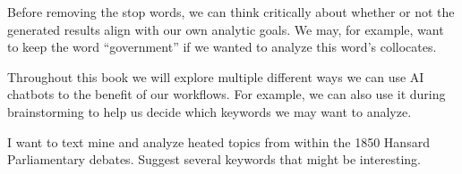 \documentclass[
]{article}
\begin{document}
Before removing the stop words, we can think critically about whether or
not the generated results align with our own analytic goals. We may, for
example, want to keep the word ``government'' if we wanted to analyze
this word's collocates.

Throughout this book we will explore multiple different ways we can use
AI chatbots to the benefit of our workflows. For example, we can also
use it during brainstorming to help us decide which keywords we may want
to analyze.

\begin{tcolorbox}[colback=blue!5!white, colframe=blue!75!black, title=User Prompt]
I want to text mine and analyze heated topics from within the 1850 Hansard Parliamentary debates. Suggest several keywords that might be interesting.
\end{tcolorbox}
\end{document}
